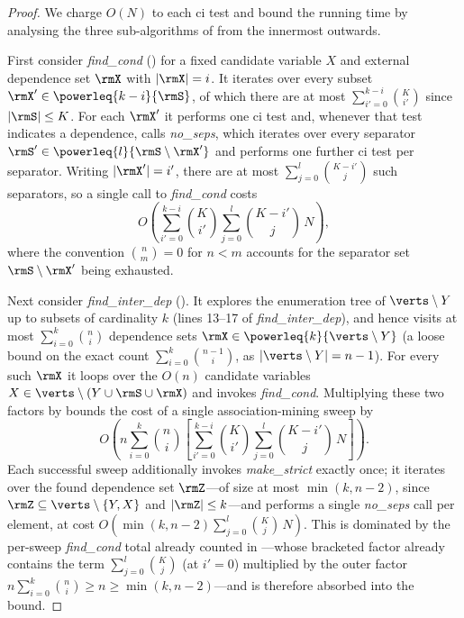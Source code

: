 \kombcomplexity*
\begin{proof}
  We charge $O(N)$ to each \gls{ci} test and bound the running time by
  analysing the three sub-algorithms of  from the
  innermost outwards.

  First consider \textit{find\_cond} () for a fixed
  candidate variable $X$ and external dependence set $\rmX$ with
  $|\rmX|=i$. It iterates over every subset
  $\rmX'\in\powerleq{k-i}{\rmS}$, of which there are at most
  $\sum_{i'=0}^{k-i}\binom{K}{i'}$ since $|\rmS|\leq K$. For each $\rmX'$
  it performs one \gls{ci} test and, whenever that test indicates a
  dependence, calls \textit{no\_seps}, which iterates over every
  separator $\rmS'\in\powerleq{l}{\rmS\setminus\rmX'}$ and performs one
  further \gls{ci} test per separator. Writing $|\rmX'|=i'$, there are at
  most $\sum_{j=0}^{l}\binom{K-i'}{j}$ such separators, so a single
  call to \textit{find\_cond} costs
  \begin{equation}
    \label{eq:cost-findcond}
    O\!\left(
      \sum_{i'=0}^{k-i}\binom{K}{i'}
      \sum_{j=0}^{l}\binom{K-i'}{j}\, N
    \right),
  \end{equation}
  where the convention $\binom{n}{m}=0$ for $n<m$ accounts for the
  separator set $\rmS\setminus\rmX'$ being exhausted.

  Next consider \textit{find\_inter\_dep} (). It
  explores the enumeration tree of $\verts\setminus Y$ up to subsets of
  cardinality $k$ (lines 13--17 of \textit{find\_inter\_dep}), and hence
  visits at most $\sum_{i=0}^{k}\binom{n}{i}$ dependence sets
  $\rmX\in\powerleq{k}{\verts\setminus Y}$ (a loose bound on the exact
  count $\sum_{i=0}^{k}\binom{n-1}{i}$, as $|\verts\setminus Y|=n-1$). For every such $\rmX$ it
  loops over the $O(n)$ candidate variables
  $X\in\verts\setminus(Y\cup\rmS\cup\rmX)$ and invokes
  \textit{find\_cond}. Multiplying these two factors by
   bounds the cost of a single association-mining
  sweep by
  \begin{equation}
    \label{eq:cost-sweep}
    O\!\left(
      n \sum_{i=0}^{k}\binom{n}{i}
      \left[
        \sum_{i'=0}^{k-i}\binom{K}{i'}
        \sum_{j=0}^{l}\binom{K-i'}{j}\, N
      \right]
    \right).
  \end{equation}
  Each successful sweep additionally invokes \textit{make\_strict}
  exactly once; it iterates over the found dependence set $\rmZ$---of
  size at most $\min(k,n-2)$, since $\rmZ\subseteq\verts\setminus\{Y,X\}$
  and $|\rmZ|\leq k$---and performs a single \textit{no\_seps} call per
  element, at cost
  $O\!\left(\min(k,n-2)\sum_{j=0}^{l}\binom{K}{j}\,N\right)$. This is dominated by
  the per-sweep \textit{find\_cond} total already counted in
  ---whose bracketed factor already contains the
  term $\sum_{j=0}^{l}\binom{K}{j}$ (at $i'=0$) multiplied by the outer
  factor $n\sum_{i=0}^{k}\binom{n}{i}\geq n\geq\min(k,n-2)$---and is
  therefore absorbed into the bound.


\end{proof}
